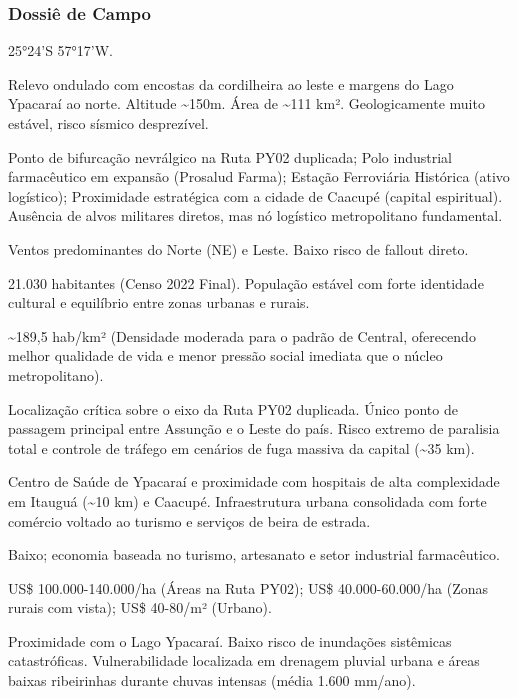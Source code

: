 \subsubsection{Dossiê de Campo}
\begin{description}[style=nextline,leftmargin=0.5cm,font=\bfseries]
\item[Coordenadas]  25°24'S 57°17'W.
\item[Topografia]  Relevo ondulado com encostas da cordilheira ao leste e margens do Lago Ypacaraí ao norte. Altitude \textasciitilde 150m. Área de \textasciitilde 111 km². Geologicamente muito estável, risco sísmico desprezível.
\item[Alvos Estratégicos]  Ponto de bifurcação nevrálgico na Ruta PY02 duplicada; Polo industrial farmacêutico em expansão (Prosalud Farma); Estação Ferroviária Histórica (ativo logístico); Proximidade estratégica com a cidade de Caacupé (capital espiritual). Ausência de alvos militares diretos, mas nó logístico metropolitano fundamental.
\item[Fallout]  Ventos predominantes do Norte (NE) e Leste. Baixo risco de fallout direto.
\item[População]  21.030 habitantes (Censo 2022 Final). População estável com forte identidade cultural e equilíbrio entre zonas urbanas e rurais.
\item[Densidade]  \textasciitilde 189,5 hab/\allowbreak km² (Densidade moderada para o padrão de Central, oferecendo melhor qualidade de vida e menor pressão social imediata que o núcleo metropolitano).
\item[Vias de Acesso]  Localização crítica sobre o eixo da Ruta PY02 duplicada. Único ponto de passagem principal entre Assunção e o Leste do país. Risco extremo de paralisia total e controle de tráfego em cenários de fuga massiva da capital (\textasciitilde 35 km).
\item[Serviços]  Centro de Saúde de Ypacaraí e proximidade com hospitais de alta complexidade em Itauguá (\textasciitilde 10 km) e Caacupé. Infraestrutura urbana consolidada com forte comércio voltado ao turismo e serviços de beira de estrada.
\item[Custo de Vida]  Baixo; economia baseada no turismo, artesanato e setor industrial farmacêutico.
\item[Preço da Terra]  US\$ 100.000-140.000/\allowbreak ha (Áreas na Ruta PY02); US\$ 40.000-60.000/\allowbreak ha (Zonas rurais com vista); US\$ 40-80/\allowbreak m² (Urbano).
\item[Hidrologia]  Proximidade com o Lago Ypacaraí. Baixo risco de inundações sistêmicas catastróficas. Vulnerabilidade localizada em drenagem pluvial urbana e áreas baixas ribeirinhas durante chuvas intensas (média 1.600 mm/\allowbreak ano).

\end{description}
